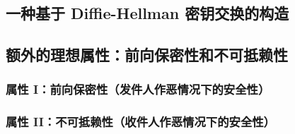 \subsection{一种基于 Diffie-Hellman 密钥交换的构造}\label{subsec:13-7-4}

\begin{game}\label{game:13-7}
	
\end{game}

\begin{definition}\label{def:13-9}
	
\end{definition}

\begin{theorem}\label{theo:13-10}
	
\end{theorem}

\subsection{额外的理想属性：前向保密性和不可抵赖性}\label{subsec:13-7-5}

\subsubsection{属性 I：前向保密性（发件人作恶情况下的安全性）}\label{subsubsec:13-7-5-1}

\begin{game}\label{game:13-8}
	
\end{game}

\begin{definition}\label{def:13-10}
	
\end{definition}

\begin{theorem}\label{theo:13-11}
	
\end{theorem}

\subsubsection{属性 II：不可抵赖性（收件人作恶情况下的安全性）}\label{subsubsec:13-7-5-2}

\begin{game}[具备不可抵赖性的密文完整性]\label{game:13-9}
	
\end{game}

\begin{definition}\label{def:13-11}
	
\end{definition}
